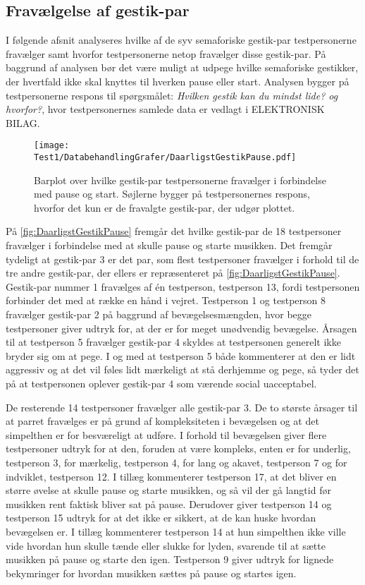 \subsection{Fravælgelse af gestik-par}
\label{TestresultaterPauseStartDaarlig}
%
I følgende afsnit analyseres hvilke af de syv semaforiske gestik-par testpersonerne fravælger samt hvorfor testpersonerne netop fravælger disse gestik-par. På baggrund af analysen bør det være muligt at udpege hvilke semaforiske gestikker, der hvertfald ikke skal knyttes til hverken pause eller start. Analysen bygger på testpersonerne respons til spørgsmålet: \textit{Hvilken gestik kan du mindst lide? og hvorfor?}, hvor testpersonernes samlede data er vedlagt i ELEKTRONISK BILAG.
%
\begin{figure}[H]
	\centering
	\texttt{[image: Test1/DatabehandlingGrafer/DaarligstGestikPause.pdf]}
	\caption{Barplot over hvilke gestik-par testpersonerne fravælger i forbindelse med pause og start. Søjlerne bygger på testpersonernes respons, hvorfor det kun er de fravalgte gestik-par, der udgør plottet.}
	\label{fig:DaarligstGestikPause}
\end{figure}
\noindent
% 
På \autoref{fig:DaarligstGestikPause} fremgår det hvilke gestik-par de 18 testpersoner fravælger i forbindelse med at skulle pause og starte musikken. Det fremgår tydeligt at gestik-par 3 er det par, som flest testpersoner fravælger i forhold til de tre andre gestik-par, der ellers er repræsenteret på \autoref{fig:DaarligstGestikPause}. Gestik-par nummer 1 fravælges af én testperson, testperson 13, fordi testpersonen forbinder det med at række en hånd i vejret. Testperson 1 og testperson 8 fravælger gestik-par 2 på baggrund af bevægelsesmængden, hvor begge testpersoner giver udtryk for, at der er for meget unødvendig bevægelse. Årsagen til at testperson 5 fravælger gestik-par 4 skyldes at testpersonen generelt ikke bryder sig om at pege. I og med at testperson 5 både kommenterer at den er lidt aggressiv og at det vil føles lidt mærkeligt at stå derhjemme og pege, så tyder det på at testpersonen oplever gestik-par 4 som værende social uacceptabel. 

De resterende 14 testpersoner fravælger alle gestik-par 3. De to største årsager til at parret fravælges er på grund af kompleksiteten i bevægelsen og at det simpelthen er for besværeligt at udføre. I forhold til bevægelsen giver flere testpersoner udtryk for at den, foruden at være kompleks, enten er for underlig, testperson 3, for mærkelig, testperson 4, for lang og akavet, testperson 7 og for indviklet, testperson 12. I tillæg kommenterer testperson 17, at det bliver en større øvelse at skulle pause og starte musikken, og så vil der gå langtid før musikken rent faktisk bliver sat på pause. Derudover giver testperson 14 og testperson 15 udtryk for at det ikke er sikkert, at de kan huske hvordan bevægelsen er. I tillæg kommenterer testperson 14 at hun simpelthen ikke ville vide hvordan hun skulle tænde eller slukke for lyden, svarende til at sætte musikken på pause og starte den igen. Testperson 9 giver udtryk for lignede bekymringer for hvordan musikken sættes på pause og startes igen.

